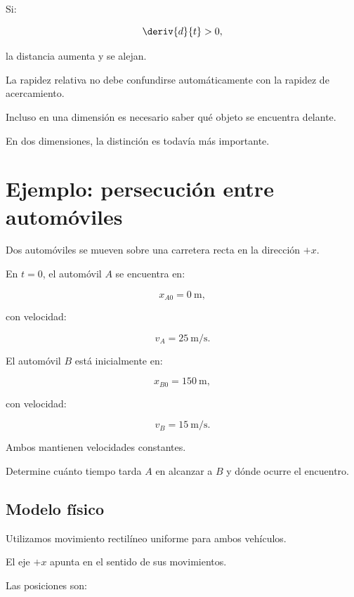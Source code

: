 Si:

\[
\deriv{d}{t}>0,
\]

la distancia aumenta y se alejan.

\begin{advertencia}

La rapidez relativa no debe confundirse automáticamente
con la rapidez de acercamiento.

Incluso en una dimensión es necesario saber qué objeto
se encuentra delante.

En dos dimensiones, la distinción es todavía más importante.

\end{advertencia}


\section{Ejemplo: persecución entre automóviles}

\begin{ejemplo}

Dos automóviles se mueven sobre una carretera recta
en la dirección \(+x\).

En \(t=0\), el automóvil \(A\) se encuentra en:

\[
x_{A0}=\SI{0}{\meter},
\]

con velocidad:

\[
v_A=\SI{25}{\meter\per\second}.
\]

El automóvil \(B\) está inicialmente en:

\[
x_{B0}=\SI{150}{\meter},
\]

con velocidad:

\[
v_B=\SI{15}{\meter\per\second}.
\]

Ambos mantienen velocidades constantes.

Determine cuánto tiempo tarda \(A\) en alcanzar a \(B\)
y dónde ocurre el encuentro.

\end{ejemplo}

\subsection*{Modelo físico}

Utilizamos movimiento rectilíneo uniforme para ambos vehículos.

El eje \(+x\) apunta en el sentido de sus movimientos.

Las posiciones son:

